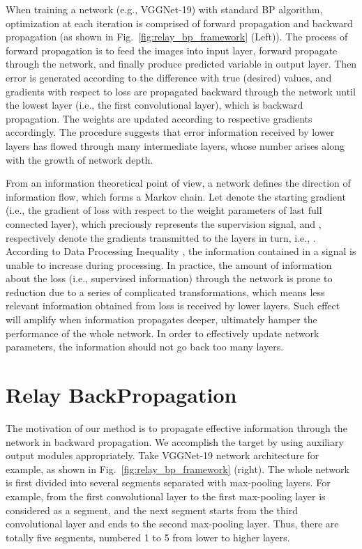 \documentclass[runningheads]{llncs}
\begin{document}
When training a network (e.g., VGGNet-19) with standard BP algorithm, optimization at each iteration is comprised of forward propagation and backward propagation (as shown in Fig.~\ref{fig:relay_bp_framework} (Left)). The process of forward propagation is to feed the images into input layer, forward propagate through the network, and finally produce predicted variable in output layer. Then error is generated according to the difference with true (desired) values, and gradients with respect to loss are propagated backward through the network until the lowest layer (i.e., the first convolutional layer), which is backward propagation. The weights are updated according to respective gradients accordingly. The procedure suggests that error information received by lower layers has flowed through many intermediate layers, whose number arises along with the growth of network depth.

From an information theoretical point of view, a network defines the direction of information flow, which forms a Markov chain. Let  denote the starting gradient (i.e., the gradient of loss with respect to the weight parameters of last full connected layer), which preciously represents the supervision signal, and ,  respectively denote the gradients transmitted to the layers in turn, i.e., . According to Data Processing Inequality \cite{cover_2006} , the information contained in a signal is unable to increase during processing. In practice, the amount of information about the loss (i.e., supervised information) through the network is prone to reduction due to a series of complicated transformations, which means less relevant information obtained from loss is received by lower layers. Such effect will amplify when information propagates deeper, ultimately hamper the performance of the whole network. In order to effectively update network parameters, the information should not go back too many layers.

\section{Relay BackPropagation}

The motivation of our method is to propagate effective information through the network in backward propagation. We accomplish the target by using auxiliary output modules appropriately. Take VGGNet-19 network architecture for example, as shown in Fig.~\ref{fig:relay_bp_framework} (right). The whole network is first divided into several segments separated with max-pooling layers. For example, from the first convolutional layer to the first max-pooling layer is considered as a segment, and the next segment starts from the third convolutional layer and ends to the second max-pooling layer. Thus, there are totally five segments, numbered 1 to 5 from lower to higher layers.
\end{document}
